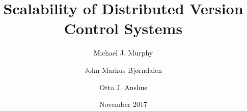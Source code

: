 \documentclass[
    usenglish,
]{nik}
\title{Scalability of Distributed Version Control Systems}
\author{
    Michael J. Murphy
    \and John Markus Bjørndalen
    \and Otto J. Anshus
}
\date{November 2017}
\begin{document}
\maketitle

\begin{abstract}

\end{abstract}










\printbibliography[]

\listoftodos

\ifoptionfinal{}{
    
}
\end{document}
